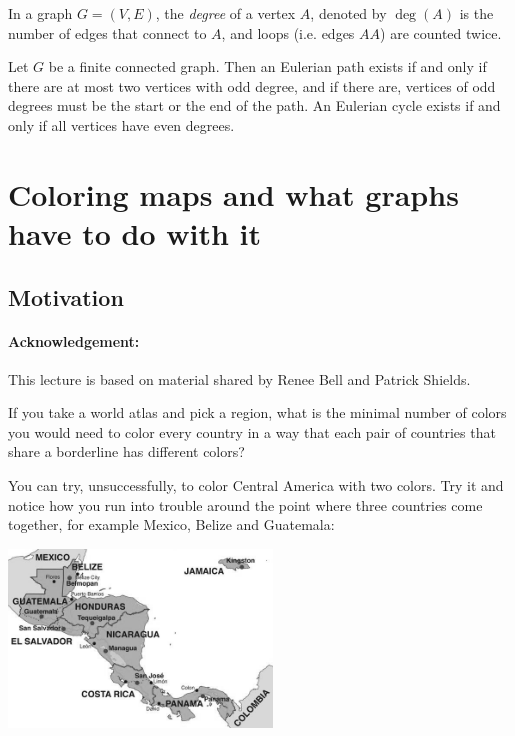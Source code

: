 \begin{definition}[Degree]
    In a graph $G = (V,E)$, the \emph{degree} of a vertex $A$, denoted by $\deg(A)$
    is the number
    of edges that connect to $A$, and loops (i.e. edges $AA$) are counted twice. 
\end{definition}




\begin{theorem}
    Let $G$ be a finite connected graph. Then an Eulerian path exists if and only if there are at most two vertices with odd degree, and if there are, vertices of odd degrees must be the start or the end of the path. An Eulerian cycle exists if and only if all vertices have even degrees.
\end{theorem}






\section{Coloring maps and what graphs have to do with it}

\subsection{Motivation}

\paragraph{Acknowledgement:} This lecture is based on material shared by Renee Bell and Patrick Shields.

\begin{question}
    If you take a world atlas and pick a region, what is the minimal number of colors you would need to color every country in a way that each pair of countries that share a borderline has different colors?
\end{question}

You can try, unsuccessfully, to color Central America with two colors. Try it and notice how you run into trouble around the point where three countries come together, for example Mexico, Belize and Guatemala:

\begin{center}
\includegraphics[width=7cm]{pics/central-america-uncolored.jpg}
\end{center}


